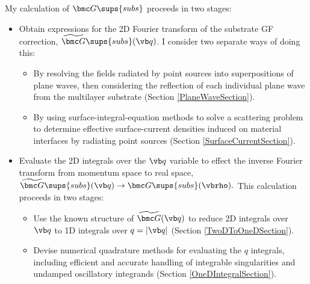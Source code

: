 \documentclass[letterpaper]{article}
\renewcommand{\wt}{\widetilde}
\begin{document}
My calculation of $\bmc G\sups{subs}$ proceeds in two stages:
\begin{itemize}
 \item Obtain expressions for the 2D Fourier transform of the
       substrate GF correction, $\wt{\bmc G}\sups{subs}(\vb q)$.
       I consider two separate ways of doing this:
       \begin{itemize}
         \item By resolving the fields radiated by point sources
               into superpositions of plane waves, then considering the 
               reflection of each individual plane wave from the 
               multilayer substrate (Section \ref{PlaneWaveSection}).
         \item By using surface-integral-equation methods to solve
               a scattering problem to determine effective 
               surface-current densities induced on material interfaces
               by radiating point sources (Section \ref{SurfaceCurrentSection}).
       \end{itemize}
         
 \item Evaluate the 2D integrals over the $\vb q$ variable
       to effect the inverse Fourier transform from momentum space
       to real space,
       $\wt{\bmc G}\sups{subs}(\vb q) \to \bmc G\sups{subs}(\vbrho).$
       This calculation proceeds in two stages:
       \begin{itemize}
         \item Use the known structure of $\wt{\bmc G}(\vb q)$
               to reduce 2D integrals over $\vb q$ to 1D integrals over $q=|\vb q|$
               (Section \ref{TwoDToOneDSection}).
         \item Devise numerical quadrature methods for evaluating the
               $q$ integrals, including efficient and accurate handling
               of integrable singularities and undamped oscillatory integrands
               (Section \ref{OneDIntegralSection}).
       \end{itemize}
\end{itemize}

\newpage
\end{document}
